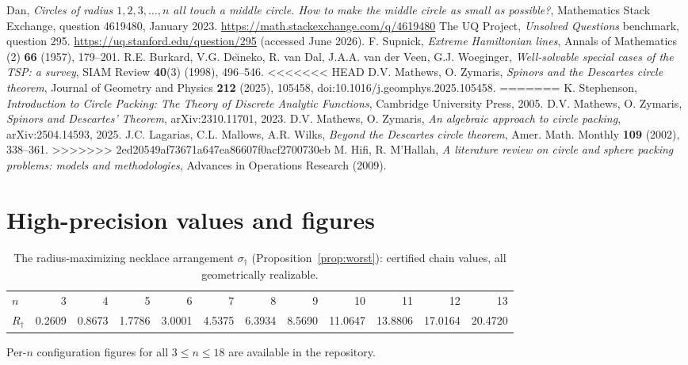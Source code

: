 \documentclass[11pt]{article}
\theoremstyle{definition}
\theoremstyle{remark}
\begin{document}
\begin{thebibliography}{9}
 Dan, \emph{Circles of radius $1,2,3,\dots,n$ all touch a middle circle. How to make the middle circle as small as possible?}, Mathematics Stack Exchange, question 4619480, January 2023. \url{https://math.stackexchange.com/q/4619480}
 The UQ Project, \emph{Unsolved Questions} benchmark, question 295. \url{https://uq.stanford.edu/question/295} (accessed June 2026).
 F. Supnick, \emph{Extreme Hamiltonian lines}, Annals of Mathematics (2) \textbf{66} (1957), 179--201.
 R.E. Burkard, V.G. De\u{\i}neko, R. van Dal, J.A.A. van der Veen, G.J. Woeginger, \emph{Well-solvable special cases of the TSP: a survey}, SIAM Review \textbf{40}(3) (1998), 496--546.
<<<<<<< HEAD
 D.V. Mathews, O. Zymaris, \emph{Spinors and the Descartes circle theorem}, Journal of Geometry and Physics \textbf{212} (2025), 105458, doi:10.1016/j.geomphys.2025.105458.
=======
 K. Stephenson, \emph{Introduction to Circle Packing: The Theory of Discrete Analytic Functions}, Cambridge University Press, 2005.
 D.V. Mathews, O. Zymaris, \emph{Spinors and Descartes' Theorem}, arXiv:2310.11701, 2023.
 D.V. Mathews, O. Zymaris, \emph{An algebraic approach to circle packing}, arXiv:2504.14593, 2025.
 J.C. Lagarias, C.L. Mallows, A.R. Wilks, \emph{Beyond the Descartes circle theorem}, Amer. Math. Monthly \textbf{109} (2002), 338--361.
>>>>>>> 2ed20549af73671a647ea86607f0acf2700730eb
 M. Hifi, R. M'Hallah, \emph{A literature review on circle and sphere packing problems: models and methodologies}, Advances in Operations Research (2009).
\end{thebibliography}

\appendix
\section{High-precision values and figures}
\begin{table}[ht]\centering
\caption{The radius-maximizing necklace arrangement $\sigma_\dagger$ (Proposition~\ref{prop:worst}): certified chain values, all geometrically realizable.}
\label{tab:worst}
\small
\begin{tabular}{lrrrrrrrrrrr}
\toprule
$n$ & 3 & 4 & 5 & 6 & 7 & 8 & 9 & 10 & 11 & 12 & 13 \\
$R_\dagger$ & 0.2609 & 0.8673 & 1.7786 & 3.0001 & 4.5375 & 6.3934 & 8.5690 & 11.0647 & 13.8806 & 17.0164 & 20.4720 \\
\bottomrule
\end{tabular}
\end{table}


Per-$n$ configuration figures for all $3\le n\le 18$ are available in the repository.
\end{document}
